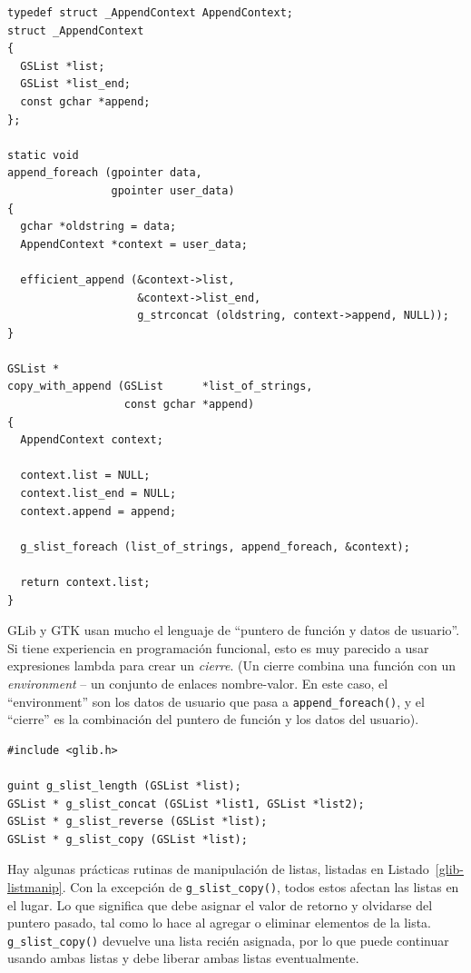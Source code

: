 \begin{lstlisting}
typedef struct _AppendContext AppendContext;
struct _AppendContext
{
  GSList *list;
  GSList *list_end;
  const gchar *append;
};

static void
append_foreach (gpointer data,
                gpointer user_data)
{
  gchar *oldstring = data;
  AppendContext *context = user_data;

  efficient_append (&context->list,
                    &context->list_end,
                    g_strconcat (oldstring, context->append, NULL));
}

GSList *
copy_with_append (GSList      *list_of_strings,
                  const gchar *append)
{
  AppendContext context;

  context.list = NULL;
  context.list_end = NULL;
  context.append = append;

  g_slist_foreach (list_of_strings, append_foreach, &context);

  return context.list;
}
\end{lstlisting}

GLib y GTK usan mucho el lenguaje de ``puntero de función y datos de usuario''. Si tiene experiencia en programación funcional, esto es muy parecido a usar expresiones lambda para crear un \emph{cierre}. (Un cierre combina una función con un \emph{environment} -- un conjunto de enlaces nombre-valor. En este caso, el ``environment'' son los datos de usuario que pasa a \lstinline{append_foreach()}, y el ``cierre'' es la combinación del puntero de función y los datos del usuario).

\begin{lstlisting}[float, caption={Manipulating a linked list}, label=glib-listmanip]
#include <glib.h>

guint g_slist_length (GSList *list);
GSList * g_slist_concat (GSList *list1, GSList *list2);
GSList * g_slist_reverse (GSList *list);
GSList * g_slist_copy (GSList *list);
\end{lstlisting}

Hay algunas prácticas rutinas de manipulación de listas, listadas en Listado~\ref{glib-listmanip}. Con la excepción de \lstinline{g_slist_copy()}, todos estos afectan las listas en el lugar. Lo que significa que debe asignar el valor de retorno y olvidarse del puntero pasado, tal como lo hace al agregar o eliminar elementos de la lista. \lstinline{g_slist_copy()} devuelve una lista recién asignada, por lo que puede continuar usando ambas listas y debe liberar ambas listas eventualmente.

